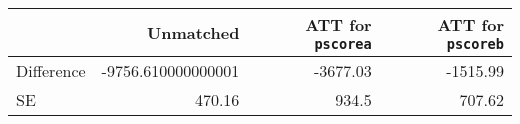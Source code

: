 \begin{table}[h!]
\begin{center}
\begin{tabular}{lrrr}
\toprule
& Unmatched & ATT for \texttt{pscorea} & ATT for \texttt{pscoreb}  \\
\hline
Difference & -9756.610000000001 & -3677.03 & -1515.99 \\
SE & 470.16 & 934.5 & 707.62 \\
\bottomrule
\end{tabular}
\end{center}
\end{table}
